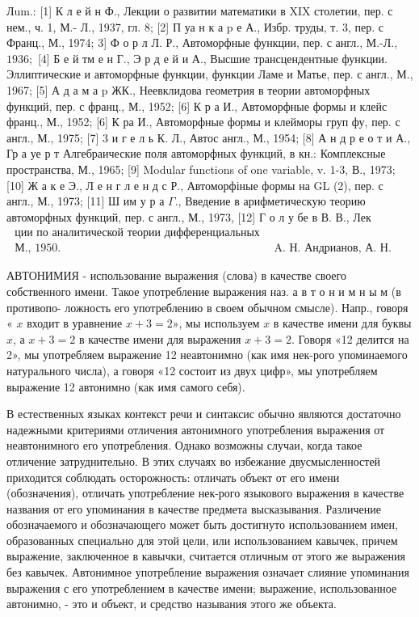 \documentclass[10pt]{article}
\begin{document}
Лum.: [1] К л е й н Ф., Лекции о развитии математики в XIX столетии, пер. с нем., ч. 1, М.- Л., 1937, гл. 8; [2] П уа н к а p е А., Избр. труды, т. 3, пер. с Франц., М., 1974; 3] Ф о р л Л. Р., Автоморфные функции, пер. с англ., М.-Л., $1936 ;$ [4] Б е й тм е н Г., Э р д е й и А., Высшие трансцендентные функции. Эллиптические и автоморфные функции, функции Ламе и Матье, пер. с англ., М., 1967; [5] А д а м а $\mathrm{p}$ ЖК., Неевклидова геометрия в теории автоморфных функций, пер. с франц., М., 1952; [6] К р а И., Автоморфные формы и клейс франц., М., 1952; [6] К ра И., Автоморфные формы и клейморы груп фу, пер. с англ., М., 1975; [7] 3 и г е л ь К. Л., Автос англ., М., 1954; [8] А н д р е о т и А., Гр а уе р т Алгебраические поля автоморфных функций, в кн.: Комплексные пространства, М., 1965; [9] Modular functions of one variable, v. 1-3, В., 1973; [10] Ж а к е Э., Л е н г л е н д с Р., Автоморфіные формы на GL (2), пер. с англ., М., 1973; [11] Ш им у р а $\Gamma$., Введение в арифметическую теорию автоморфных функций, пер. с англ., М., 1973, [12] Г о л у бе в В. В., Лек$\begin{array}{ll}\text { ции по аналитической теории дифференциальных уравнений, } \\ \text { М., } 1950 . & \text { A. Н. Андрианов, А. Н. Париин. }\end{array}$



АВТОНИМИЯ - использование выражения (слова) в качестве своего собственного имени. Такое употребление выражения наз. а в т о н и м н ы м (в противопо- ложность его употреблению в своем обычном смысле). Напр., говоря « $x$ входит в уравнение $x+3=2 »$, мы используем $x$ в качестве имени для буквы $x$, а $x+3=2$ в качестве имени для выражения $x+3=2$. Говоря «12 делится на 2», мы употребляем выражение 12 неавтонимно (как имя нек-рого упоминаемого натурального числа), а говоря «12 состоит из двух цифр», мы употребляем выражение 12 автонимно (как имя самого себя).



В естественных языках контекст речи и синтаксис обычно являются достаточно надежными критериями отличения автонимного употребления выражения от неавтонимного его употребления. Однако возможны случаи, когда такое отличение затруднительно. В этих случаях во избежание двусмысленностей приходится соблюдать осторожность: отличать объект от его имени (обозначения), отличать употребление нек-рого языкового выражения в качестве названия от его упоминания в качестве предмета высказывания. Различение обозначаемого и обозначающего может быть достигнуто использованием имен, образованных специально для этой цели, или использованием кавычек, причем выражение, заключенное в кавычки, считается отличным от этого же выражения без кавычек. Автонимное употребление выражения означает слияние упоминания выражения с его употреблением в качестве имени; выражение, использованное автонимно, - это и объект, и средство называния этого же объекта.
\end{document}

